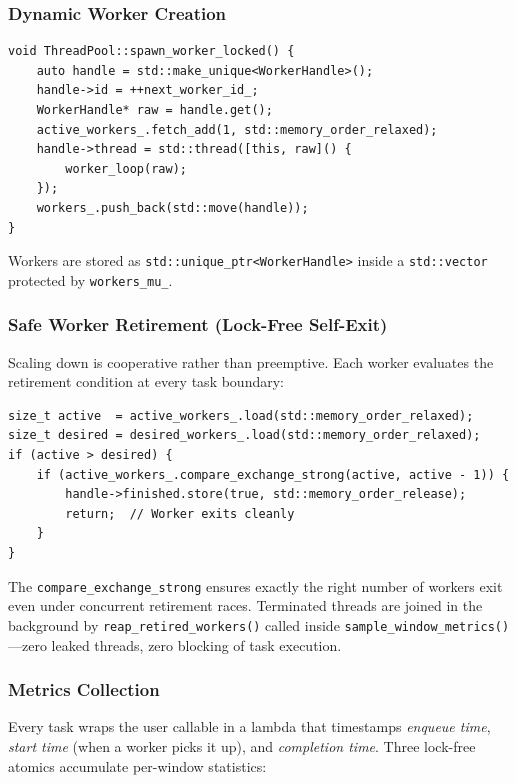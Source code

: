 \documentclass[12pt,a4paper]{article}
\begin{document}
\subsubsection{Dynamic Worker Creation}

\begin{lstlisting}[caption={Worker spawning inside \texttt{spawn\_worker\_locked()}.}]
void ThreadPool::spawn_worker_locked() {
    auto handle = std::make_unique<WorkerHandle>();
    handle->id = ++next_worker_id_;
    WorkerHandle* raw = handle.get();
    active_workers_.fetch_add(1, std::memory_order_relaxed);
    handle->thread = std::thread([this, raw]() {
        worker_loop(raw);
    });
    workers_.push_back(std::move(handle));
}
\end{lstlisting}

Workers are stored as \texttt{std::unique\_ptr<WorkerHandle>} inside a
\texttt{std::vector} protected by \texttt{workers\_mu\_}.

\subsubsection{Safe Worker Retirement (Lock-Free Self-Exit)}

Scaling down is cooperative rather than preemptive.
Each worker evaluates the retirement condition at every task boundary:

\begin{lstlisting}[caption={Retirement check at the top of \texttt{worker\_loop()}.}]
size_t active  = active_workers_.load(std::memory_order_relaxed);
size_t desired = desired_workers_.load(std::memory_order_relaxed);
if (active > desired) {
    if (active_workers_.compare_exchange_strong(active, active - 1)) {
        handle->finished.store(true, std::memory_order_release);
        return;  // Worker exits cleanly
    }
}
\end{lstlisting}

The \texttt{compare\_exchange\_strong} ensures exactly the right number of
workers exit even under concurrent retirement races.
Terminated threads are joined in the background by
\texttt{reap\_retired\_workers()} called inside
\texttt{sample\_window\_metrics()}---zero leaked threads, zero blocking of
task execution.

\subsubsection{Metrics Collection}

Every task wraps the user callable in a lambda that timestamps
\emph{enqueue time}, \emph{start time} (when a worker picks it up), and
\emph{completion time}.
Three lock-free atomics accumulate per-window statistics:
\end{document}
